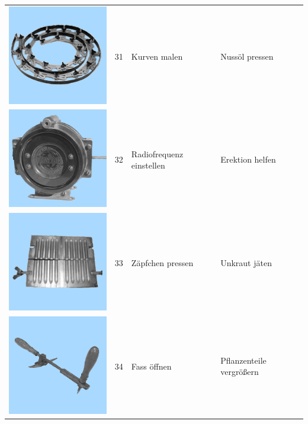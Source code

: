 \documentclass[
  english,
  doc,12pt,twoside,floatsintext]{apa7}
\begin{document}
\begin{center}
\begin{ThreePartTable}
\begin{longtable}{llll}
\includegraphics[valign=c, scale=0.19]{../materials/unfamiliar/31.png} & 31 & Kurven malen & Nussöl pressen\\
\includegraphics[valign=c, scale=0.19]{../materials/unfamiliar/32.png} & 32 & Radiofrequenz einstellen & Erektion helfen\\
\includegraphics[valign=c, scale=0.19]{../materials/unfamiliar/33.png} & 33 & Zäpfchen pressen & Unkraut jäten\\
\includegraphics[valign=c, scale=0.19]{../materials/unfamiliar/34.png} & 34 & Fass öffnen & Pflanzenteile vergrößern\\

\end{longtable}
\end{ThreePartTable}
\end{center}
\end{document}
